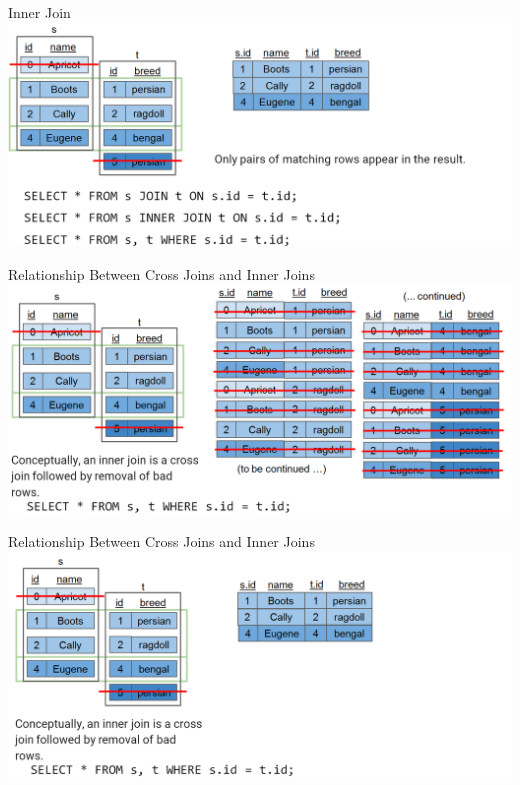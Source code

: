 \documentclass[aspectratio=169]{../latex_main/tntbeamer}  %
\begin{document}
	
	\begin{frame}{Inner Join}
	    \includegraphics[scale=.4]{Bild12}
	\end{frame}
	
	
	
	\begin{frame}{Relationship Between Cross Joins and Inner Joins}
	    \includegraphics[scale=.38]{Bild13}
	\end{frame}
	
	
	
	
	\begin{frame}{Relationship Between Cross Joins and Inner Joins}
	    \includegraphics[scale=.4]{Bild14}
	\end{frame}
	
\end{document}
